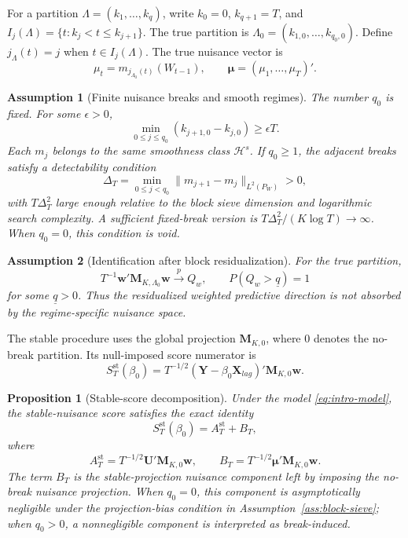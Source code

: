 \documentclass[12pt]{article} %
\numberwithin{equation}{section}
\newtheorem{proposition}{Proposition}
\newtheorem{assumption}{Assumption}
\theoremstyle{definition}
\begin{document}
For a partition \(\Lambda=(k_1,\ldots,k_q)\), write \(k_0=0\), \(k_{q+1}=T\), and \(I_j(\Lambda)=\{t:k_j<t\leq k_{j+1}\}\). The true partition is \(\Lambda_0=(k_{1,0},\ldots,k_{q_0,0})\). Define \(j_\Lambda(t)=j\) when \(t\in I_j(\Lambda)\). The true nuisance vector is
\[
    \mu_t=m_{j_{\Lambda_0}(t)}(W_{t-1}),
    \qquad
    \bm\mu=(\mu_1,\ldots,\mu_T)'.
\]

\begin{assumption}[Finite nuisance breaks and smooth regimes]
\label{ass:breaks}
The number \(q_0\) is fixed. For some \(\epsilon>0\),
\[
    \min_{0\leq j\leq q_0}(k_{j+1,0}-k_{j,0})\geq \epsilon T.
\]
Each \(m_j\) belongs to the same smoothness class \(\mathcal H^s\). If \(q_0\geq1\), the adjacent breaks satisfy a detectability condition
\[
    \Delta_T
    =
    \min_{0\leq j<q_0}
    \|m_{j+1}-m_j\|_{L^2(P_W)}
    >0,
\]
with \(T\Delta_T^2\) large enough relative to the block sieve dimension and logarithmic search complexity. A sufficient fixed-break version is \(T\Delta_T^2/(K\log T)\to\infty\). When \(q_0=0\), this condition is void.
\end{assumption}

\begin{assumption}[Identification after block residualization]
\label{ass:identification}
For the true partition,
\[
    T^{-1}\bm w'\bm M_{K,\Lambda_0}\bm w
    \xrightarrow{p} Q_w,
    \qquad
    P(Q_w>\underline q)=1
\]
for some \(\underline q>0\). Thus the residualized weighted predictive direction is not absorbed by the regime-specific nuisance space.
\end{assumption}

The stable procedure uses the global projection \(\bm M_{K,0}\), where \(0\) denotes the no-break partition. Its null-imposed score numerator is
\[
    S_T^{\mathrm{st}}(\beta_0)
    =
    T^{-1/2}
    (\bm Y-\beta_0\bm X_{lag})'
    \bm M_{K,0}\bm w.
\]

\begin{proposition}[Stable-score decomposition]
\label{prop:stable-decomp}
Under the model \eqref{eq:intro-model}, the stable-nuisance score satisfies the exact identity
\[
    S_T^{\mathrm{st}}(\beta_0)
    =
    A_T^{\mathrm{st}}
    +
    B_T,
\]
where
\[
    A_T^{\mathrm{st}}
    =
    T^{-1/2}\bm U'\bm M_{K,0}\bm w,
    \qquad
    B_T
    =
    T^{-1/2}\bm\mu'\bm M_{K,0}\bm w.
\]
The term \(B_T\) is the stable-projection nuisance component left by imposing the no-break nuisance projection. When \(q_0=0\), this component is asymptotically negligible under the projection-bias condition in Assumption~\ref{ass:block-sieve}; when \(q_0>0\), a nonnegligible component is interpreted as break-induced.
\end{proposition}
\end{document}
